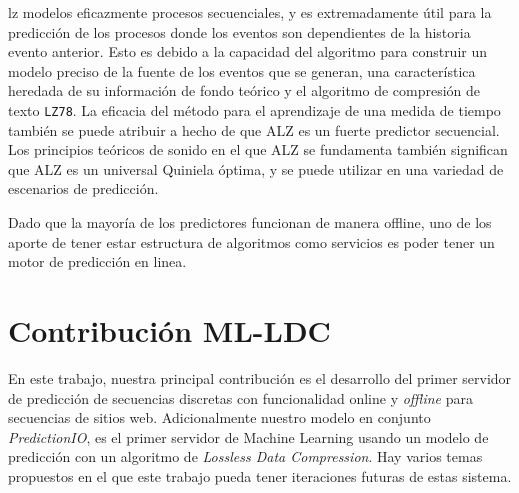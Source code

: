 %

lz modelos eficazmente procesos secuenciales, y es extremadamente útil para la predicción de los procesos donde los eventos son dependientes de la historia evento anterior. Esto es debido a la capacidad del algoritmo para construir un modelo preciso de la fuente de los eventos que se generan, una característica heredada de su información de fondo teórico y el algoritmo de compresión de texto \texttt{LZ78}.
%
La eficacia del método para el aprendizaje de una medida de tiempo también se puede atribuir a hecho de que ALZ es un fuerte predictor secuencial. Los principios teóricos de sonido en el que ALZ se fundamenta también significan que ALZ es un universal Quiniela óptima, y se puede utilizar en una variedad de escenarios de predicción.
%

Dado que la mayoría de los predictores funcionan de 
manera offline, uno de los aporte de tener estar estructura de algoritmos como servicios es poder tener un motor de predicción en linea.

\section{Contribución ML-LDC}


En este trabajo,  nuestra principal contribución es el desarrollo del primer servidor de predicción de secuencias discretas con funcionalidad online y \emph{offline} para secuencias de  sitios web. Adicionalmente nuestro modelo en conjunto \emph{PredictionIO}, es el primer servidor de Machine Learning usando un modelo de predicción con un algoritmo de \emph{Lossless Data Compression}. Hay varios temas propuestos en el que este trabajo pueda tener iteraciones  futuras de estas sistema. 